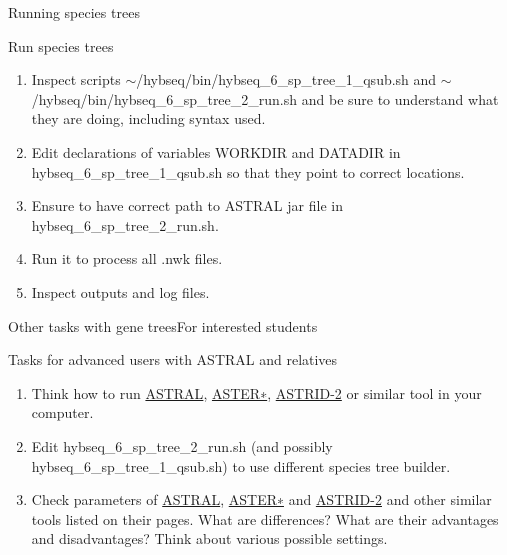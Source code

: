 \documentclass[compress,  xelatex, 11pt, xcolor=x11names, aspectratio=169,
	hyperref={
		bookmarks=true,
		unicode=true,
		colorlinks=true,
		pdftitle={HybSeq course},
		plainpages=false,
		pdfauthor={Vojtech Zeisek},
		pdfsubject={Practical processing of HybSeq target enrichment sequencing data on computing grids like MetaCentrum},
		pdfcreator={XeLaTeX},
		pdfkeywords={BASH, command line, GNU, HybSeq, Linux, MetaCentrum, sequencing shell, target enrichment},
		linkcolor=Turquoise4, %
		anchorcolor=DodgerBlue4, %
		citecolor=DodgerBlue4, %
		filecolor=DodgerBlue4, %
		menucolor=Tan4, %
		urlcolor=DarkOliveGreen4 %
		},
	url={hyphens, lowtilde} %
	]{beamer}
\renewcommand{\texttt}[1]{\colorbox{Cornsilk2}{{\ttfamily #1}}}
\begin{document}
\begin{frame}{Running species trees}
	\begin{exampleblock}{Run species trees}
		\begin{enumerate}
			\item Inspect scripts \texttt{$\sim$/hybseq/bin/hybseq\_6\_sp\_tree\_1\_qsub.sh} and \texttt{$\sim$/hybseq/bin/hybseq\_6\_sp\_tree\_2\_run.sh} and be sure to understand what they are doing, including syntax used.
			\item Edit declarations of variables \texttt{WORKDIR} and \texttt{DATADIR} in \texttt{hybseq\_6\_sp\_tree\_1\_qsub.sh} so that they point to correct locations.
			\item Ensure to have correct path to ASTRAL \texttt{jar} file in \texttt{hybseq\_6\_sp\_tree\_2\_run.sh}.
			\item Run it to process all \texttt{*.nwk} files.
			\item Inspect outputs and log files.
		\end{enumerate}
	\end{exampleblock}
\end{frame}

\begin{frame}{Other tasks with gene trees}{For interested students}
	\begin{exampleblock}{Tasks for advanced users with ASTRAL and relatives}
		\begin{enumerate}
			\item Think how to run \href{https://github.com/smirarab/ASTRAL}{ASTRAL}, \href{https://github.com/chaoszhang/ASTER}{ASTER∗}, \href{https://github.com/pranjalv123/ASTRID}{ASTRID-2} or similar tool in your computer.
			\item Edit \texttt{hybseq\_6\_sp\_tree\_2\_run.sh} (and possibly \texttt{hybseq\_6\_sp\_tree\_1\_qsub.sh}) to use different species tree builder.
			\item Check parameters of \href{https://github.com/smirarab/ASTRAL}{ASTRAL}, \href{https://github.com/chaoszhang/ASTER}{ASTER∗} and \href{https://github.com/pranjalv123/ASTRID}{ASTRID-2} and other similar tools listed on their pages. What are differences? What are their advantages and disadvantages? Think about various possible settings.
		\end{enumerate}
	\end{exampleblock}
\end{frame}
\end{document}
